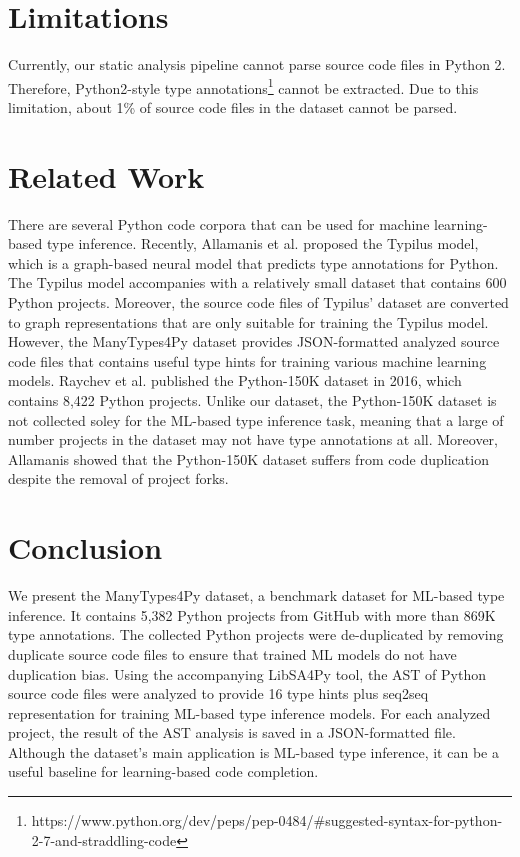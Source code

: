\documentclass[10pt, conference]{IEEEtran}
\begin{document}
\section{Limitations}
Currently, our static analysis pipeline cannot parse source code files in Python 2. Therefore, Python2-style type annotations\footnote{https://www.python.org/dev/peps/pep-0484/\#suggested-syntax-for-python-2-7-and-straddling-code} cannot be extracted. Due to this limitation, about 1\% of source code files in the dataset cannot be parsed.

\section{Related Work}
There are several Python code corpora that can be used for machine learning-based type inference. Recently, Allamanis et al. \cite{allamanis2020typilus} proposed the Typilus model, which is a graph-based neural model that predicts type annotations for Python. The Typilus model \cite{allamanis2020typilus} accompanies with a relatively small dataset that contains 600 Python projects. Moreover, the source code files of Typilus' dataset are converted to graph representations that are only suitable for training the Typilus model. However, the ManyTypes4Py dataset provides JSON-formatted analyzed source code files that contains useful type hints for training various machine learning models. Raychev et al. \cite{raychev2016probabilistic} published the Python-150K dataset in 2016, which contains 8,422 Python projects. Unlike our dataset, the Python-150K dataset \cite{raychev2016probabilistic} is not collected soley for the ML-based type inference task, meaning that a large of number projects in the dataset may not have type annotations at all. Moreover, Allamanis \cite{allamanis2019adverse} showed that the Python-150K dataset suffers from code duplication despite the removal of project forks.

\section{Conclusion}
We present the ManyTypes4Py dataset, a benchmark dataset for ML-based type inference. It contains 5,382 Python projects from GitHub with more than 869K type annotations. The collected Python projects were de-duplicated by removing duplicate source code files to ensure that trained ML models do not have duplication bias. Using the accompanying LibSA4Py tool, the AST of Python source code files were analyzed to provide 16 type hints plus seq2seq representation for training ML-based type inference models. For each analyzed project, the result of the AST analysis is saved in a JSON-formatted file. Although the dataset's main application is ML-based type inference, it can be a useful baseline for learning-based code completion.
\end{document}
